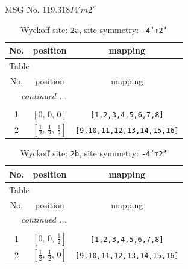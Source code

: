 \documentclass[fleqn,8pt]{jsarticle}
\begin{document}
\setcounter{MaxMatrixCols}{32}

\renewcommand{\tablename}{Table~}
\renewcommand{\figurename}{Figure~}
\begin{center}
\LARGE
MSG No. 119.318\quad$I\bar{4}'m2'$
\end{center}
\renewcommand{\arraystretch}{1.2}
\begin{longtable}{ccc}
\caption{Wyckoff site: {\tt 2a}, site symmetry: {\tt -4'm2'}}
 \\
 \hline \hline
No. & position & mapping \\ \hline \endfirsthead

\multicolumn{2}{l}{\tablename\ \thetable{}} \\
 \hline \hline
No. & position & mapping \\ \hline \endhead

 \hline \hline
\multicolumn{2}{r}{\footnotesize\it continued ...} \\ \endfoot

 \hline \hline
\multicolumn{2}{r}{} \\ \endlastfoot

1 & $\left[ 0,\, 0,\, 0 \right]$ & {\tt [1,2,3,4,5,6,7,8]} \\ \hline
2 & $\left[ \frac{1}{2},\, \frac{1}{2},\, \frac{1}{2} \right]$ & {\tt [9,10,11,12,13,14,15,16]} \\
\end{longtable}
\renewcommand{\arraystretch}{1.2}
\begin{longtable}{ccc}
\caption{Wyckoff site: {\tt 2b}, site symmetry: {\tt -4'm2'}}
 \\
 \hline \hline
No. & position & mapping \\ \hline \endfirsthead

\multicolumn{2}{l}{\tablename\ \thetable{}} \\
 \hline \hline
No. & position & mapping \\ \hline \endhead

 \hline \hline
\multicolumn{2}{r}{\footnotesize\it continued ...} \\ \endfoot

 \hline \hline
\multicolumn{2}{r}{} \\ \endlastfoot

1 & $\left[ 0,\, 0,\, \frac{1}{2} \right]$ & {\tt [1,2,3,4,5,6,7,8]} \\ \hline
2 & $\left[ \frac{1}{2},\, \frac{1}{2},\, 0 \right]$ & {\tt [9,10,11,12,13,14,15,16]} \\
\end{longtable}
\end{document}
